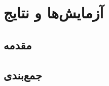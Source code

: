 
\chapter{آزمایش‌ها و نتایج}
\label{ExperimentsResultChapter}



\section{مقدمه}

\section{جمع‌بندی}
